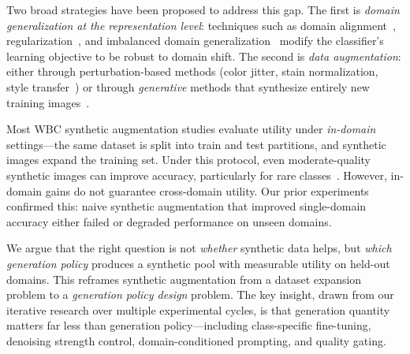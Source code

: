 \documentclass[10pt,twocolumn]{article}
\begin{document}
Two broad strategies have been proposed to address this gap. The first is
\emph{domain generalization at the representation level}: techniques such
as domain alignment~\citep{li2024stainawaredomainalignmentimbalance},
regularization~\citep{li2020domaingeneralizationmedicalimaging}, and
imbalanced domain generalization~\citep{umer2023imbalanceddomaingeneralizationrobust}
modify the classifier's learning objective to be robust to domain shift.
The second is \emph{data augmentation}: either through perturbation-based
methods (color jitter, stain normalization, style
transfer~\citep{su2022rethinkingdataaugmentationsinglesource,
shen2025stylecontentdecompositionbaseddata,
doerrich2026stylizingvitanatomypreservinginstance}) or through
\emph{generative} methods that synthesize entirely new training
images~\citep{Almezhghwi_2020, Jung_2022, Boada_2025, Hassini_2025}.

Most WBC synthetic augmentation studies evaluate utility under
\emph{in-domain} settings---the same dataset is split into train and test
partitions, and synthetic images expand the training set. Under this
protocol, even moderate-quality synthetic images can improve accuracy,
particularly for rare classes~\citep{Boada_2025, Hassini_2025}. However,
in-domain gains do not guarantee cross-domain utility. Our prior
experiments confirmed this: naive synthetic augmentation that improved
single-domain accuracy either failed or degraded performance on unseen
domains.

We argue that the right question is not \emph{whether} synthetic data
helps, but \emph{which generation policy} produces a synthetic pool with
measurable utility on held-out domains. This reframes synthetic
augmentation from a dataset expansion problem to a \emph{generation
policy design} problem. The key insight, drawn from our iterative
research over multiple experimental cycles, is that generation quantity
matters far less than generation policy---including class-specific
fine-tuning, denoising strength control, domain-conditioned prompting,
and quality gating.
\end{document}
